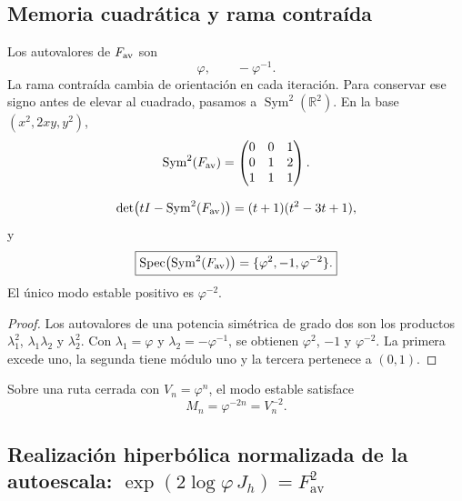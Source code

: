 \subsection{Memoria cuadrática y rama contraída}

Los autovalores de \(F_{\rm av}\) son
\[
 \varphi,
 \qquad
 -\varphi^{-1}.
\]
La rama contraída cambia de orientación en cada iteración. Para conservar
ese signo antes de elevar al cuadrado, pasamos a
\(\operatorname{Sym}^2(\mathbb R^2)\). En la base
\((x^2,2xy,y^2)\),
\begin{equation}
 \operatorname{Sym}^2(F_{\rm av})=
 \begin{pmatrix}
 0&0&1\\
 0&1&2\\
 1&1&1
 \end{pmatrix}.
 \label{p12-83-c9-s3:eq:sym2-Fav-phi}
\end{equation}

\begin{theorem}
\label{p12-83-c9-s3:thm:espectro-sym2-phi}
\[
 \det\bigl(tI-\operatorname{Sym}^2(F_{\rm av})\bigr)
 =(t+1)(t^2-3t+1),
\]
y
\begin{equation}
 \boxed{
 \operatorname{Spec}\bigl(\operatorname{Sym}^2(F_{\rm av})\bigr)
 =\{\varphi^2,-1,\varphi^{-2}\}.}
 \label{p12-83-c9-s3:eq:espectro-sym2-phi}
\end{equation}
El único modo estable positivo es \(\varphi^{-2}\).
\end{theorem}

\begin{proof}
Los autovalores de una potencia simétrica de grado dos son los productos
\(\lambda_1^2\), \(\lambda_1\lambda_2\) y \(\lambda_2^2\). Con
\(\lambda_1=\varphi\) y \(\lambda_2=-\varphi^{-1}\), se obtienen
\(\varphi^2\), \(-1\) y \(\varphi^{-2}\). La primera excede uno, la
segunda tiene módulo uno y la tercera pertenece a \((0,1)\).
\end{proof}

Sobre una ruta cerrada con \(V_n=\varphi^n\), el modo estable satisface
\begin{equation}
 \boxed{M_n=\varphi^{-2n}=V_n^{-2}.}
 \label{p12-83-c9-s3:eq:modo-estable-phi}
\end{equation}

\subsection{Realización hiperbólica normalizada de la autoescala: \(\exp(2\log\varphi\,J_h)=F_{\mathrm{av}}^2\)}

